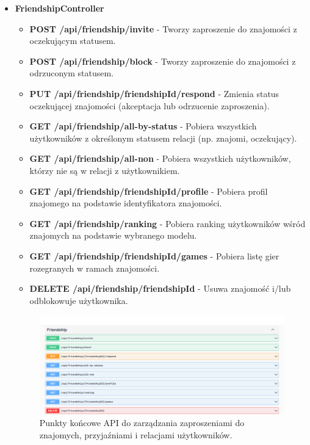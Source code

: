 \documentclass[12pt,a4paper]{article}
\begin{document}
\begin{itemize}
    \item \textbf{FriendshipController}
    \begin{itemize} 
        \item \textbf{POST /api/friendship/invite} - Tworzy zaproszenie do znajomości z oczekującym statusem. 
        \item \textbf{POST /api/friendship/block} - Tworzy zaproszenie do znajomości z odrzuconym statusem. 
        \item \textbf{PUT /api/friendship/{friendshipId}/respond} - Zmienia status oczekującej znajomości (akceptacja lub odrzucenie zaproszenia). 
        \item \textbf{GET /api/friendship/all-by-status} - Pobiera wszystkich użytkowników z określonym statusem relacji (np. znajomi, oczekujący). 
        \item \textbf{GET /api/friendship/all-non} - Pobiera wszystkich użytkowników, którzy nie są w relacji z użytkownikiem. 
        \item \textbf{GET /api/friendship/{friendshipId}/profile} - Pobiera profil znajomego na podstawie identyfikatora znajomości. 
        \item \textbf{GET /api/friendship/ranking} - Pobiera ranking użytkowników wśród znajomych na podstawie wybranego modelu. 
        \item \textbf{GET /api/friendship/{friendshipId}/games} - Pobiera listę gier rozegranych w ramach znajomości. 
        \item \textbf{DELETE /api/friendship/{friendshipId}} - Usuwa znajomość i/lub odblokowuje użytkownika. 
    \end{itemize}
    \begin{figure}[h!]
        \centering
        \includegraphics[width=1\textwidth]{zdj/friendship_controller.png}
        \caption{Punkty końcowe API do zarządzania zaproszeniami do znajomych, przyjaźniami i relacjami użytkowników.}
        
    \end{figure}


\end{itemize}
\end{document}
